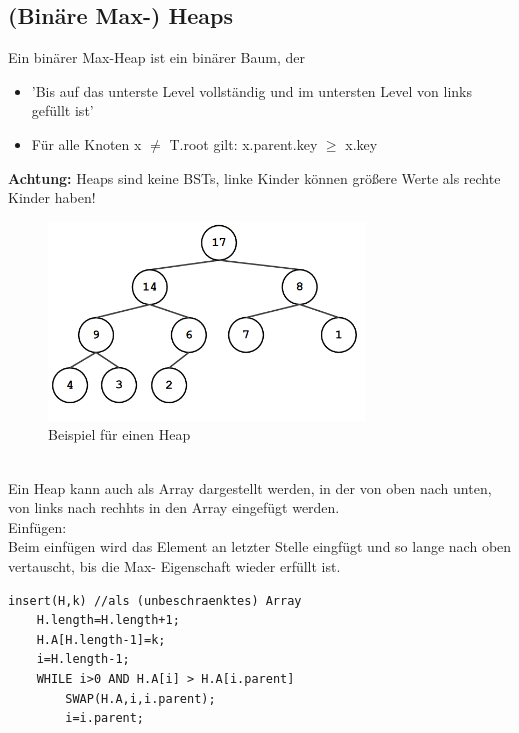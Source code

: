 \documentclass{article}
\begin{document}
        \subsection{(Binäre Max-) Heaps}
            Ein binärer Max-Heap ist ein binärer Baum, der
            \begin{itemize}
                \item 'Bis auf das unterste Level vollständig und im untersten Level von links gefüllt ist'
                \item Für alle Knoten x $\neq$ T.root gilt: x.parent.key $\geq$ x.key
            \end{itemize}
            \textbf{Achtung:} Heaps sind keine BSTs, linke Kinder können größere Werte als rechte Kinder haben!\\
            \begin{figure}[ht]
                \centering
                \includegraphics[width=0.75\textwidth]{Bilder/BspHeaps.png}
                \caption{Beispiel für einen Heap}
                \label{fig:BspHeaps}
            \end{figure}\\
            Ein Heap kann auch als Array dargestellt werden, in der von oben nach unten, von links nach rechhts in den Array eingefügt werden.\\
            Einfügen:\\
            Beim einfügen wird das Element an letzter Stelle eingfügt und so lange nach oben vertauscht, bis die Max- Eigenschaft wieder erfüllt ist.\\
            \begin{lstlisting}[style=pseudocode]
insert(H,k) //als (unbeschraenktes) Array
    H.length=H.length+1;
    H.A[H.length-1]=k;
    i=H.length-1;
    WHILE i>0 AND H.A[i] > H.A[i.parent]
        SWAP(H.A,i,i.parent);
        i=i.parent;
            \end{lstlisting}
\end{document}
